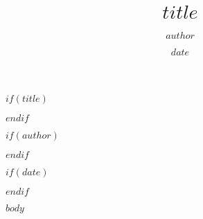 \documentclass[12pt,a4paper]{report}
\begin{document}
$if(title)$
\title{$title$}
$endif$

$if(author)$
\author{$author$}
$endif$

$if(date)$
\date{$date$}
$endif$

\maketitle
\tableofcontents
\thispagestyle{empty}
\cleardoublepage

$body$
\end{document}
